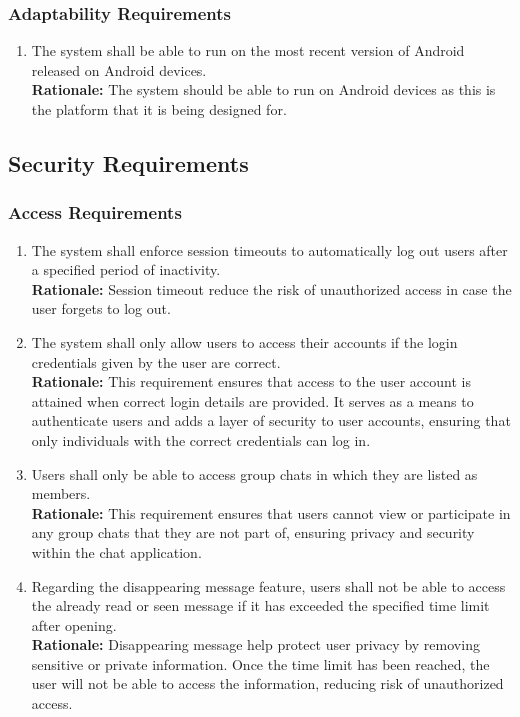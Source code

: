 \documentclass[]{article}
\begin{document}
\subsubsection{Adaptability Requirements}
\label{ssub:adaptability_requirements}
\begin{enumerate}[{MS-A}1. ]
	\item The system shall be able to run on the most recent version of Android released on Android devices. \\
	      {\bf Rationale:} The system should be able to run on Android devices as this is the platform that it is being designed for.
\end{enumerate}


\subsection{Security Requirements}
\label{sub:security_requirements}
\subsubsection{Access Requirements}
\label{ssub:access_requirements}
\begin{enumerate}[{SR-AC}1. ]
	\item The system shall enforce session timeouts to automatically log out users after a specified period of inactivity. \\
	      {\bf Rationale:} Session timeout reduce the risk of unauthorized access in case the user forgets to log out.
	\item The system shall only allow users to access their accounts if the login credentials given by the user are correct. \\
	      {\bf Rationale:} This requirement ensures that access to the user account is attained when correct login details are provided.
	      It serves as a means to authenticate users and adds a layer of security to user accounts, ensuring that only individuals with the
	      correct credentials can log in.
	\item Users shall only be able to access group chats in which they are listed as members. \\
	      {\bf Rationale:} This requirement ensures that users cannot view or participate in any group chats that
	      they are not part of, ensuring privacy and security within the chat application.
	\item Regarding the disappearing message feature, users shall not be able to access the already read or seen message if it has exceeded the specified time limit
	      after opening. \\
	      {\bf Rationale:} Disappearing message help protect user privacy by removing sensitive or private information.
	      Once the time limit has been reached, the user will not be able to access the information, reducing risk
	      of unauthorized access.
\end{enumerate}
\end{document}
